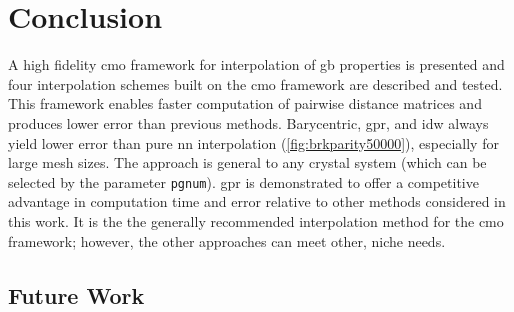 \documentclass[preprint,12pt]{elsarticle}
\begin{document}
\begin{figure}
{    %
    }
    \label{fig:runtime}
\end{figure}

\section{Conclusion} \label{sec:conclusion}

A high fidelity \gls{cmo} framework for interpolation of \gls{gb} properties is presented and four interpolation schemes built on the \gls{cmo} framework are described and tested. This framework enables faster computation of pairwise distance matrices and produces lower error than previous methods.
Barycentric, \gls{gpr}, and \gls{idw} always yield lower error than pure \gls{nn} interpolation (\cref{fig:brkparity50000}), especially for large mesh sizes. The approach is general to any crystal system (which can be selected by the parameter \texttt{pgnum}). \Gls{gpr} is demonstrated to offer a competitive advantage in computation time and error relative to other methods considered in this work. It is the the generally recommended interpolation method for the \gls{cmo} framework; however, the other approaches can meet other, niche needs.
    
\subsection{Future Work} \label{sec:conclusions:future}
\end{document}
